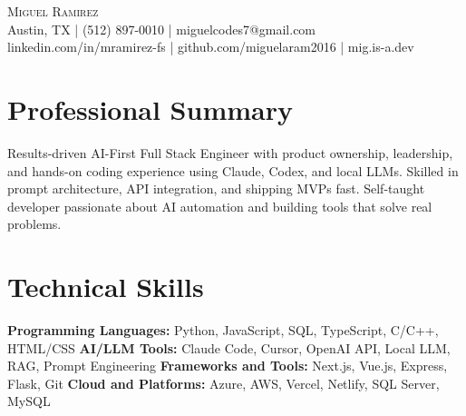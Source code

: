 \documentclass[letterpaper,10pt]{article}
\begin{document}
\begin{center}
  {\Large \scshape Miguel Ramirez} \\ \vspace{0pt}
  Austin, TX | (512) 897-0010 | miguelcodes7@gmail.com \\ 
  linkedin.com/in/mramirez-fs | github.com/miguelaram2016 | mig.is-a.dev
\end{center}

\section*{Professional Summary}
Results-driven AI-First Full Stack Engineer with product ownership, leadership, and hands-on coding experience using Claude, Codex, and local LLMs. Skilled in prompt architecture, API integration, and shipping MVPs fast. Self-taught developer passionate about AI automation and building tools that solve real problems.

\section*{Technical Skills}
\textbf{Programming Languages:} Python, JavaScript, SQL, TypeScript, C/C++, HTML/CSS \newline
\textbf{AI/LLM Tools:} Claude Code, Cursor, OpenAI API, Local LLM, RAG, Prompt Engineering \newline
\textbf{Frameworks and Tools:} Next.js, Vue.js, Express, Flask, Git \newline
\textbf{Cloud and Platforms:} Azure, AWS, Vercel, Netlify, SQL Server, MySQL

\end{document}
